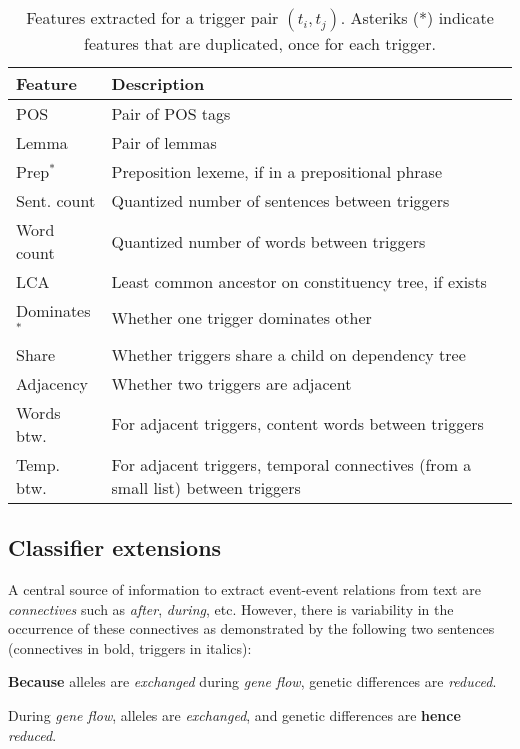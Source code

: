 \begin{table}[t]
\setlength{\tabcolsep}{5pt}
{\scriptsize
\hfill{}
\begin{tabular}{|p{1.3cm}|p{6cm}|}
\hline
\textbf{Feature} &\textbf{Description}\\
\hline
 POS & \scriptsize{Pair of POS tags} \\
Lemma & \scriptsize{Pair of lemmas} \\
Prep$^*$ & \scriptsize{Preposition lexeme, if in a prepositional phrase} \\
Sent. count & \scriptsize{Quantized number of sentences between triggers} \\
Word count & \scriptsize{Quantized number of words between triggers} \\
LCA & \scriptsize{Least common ancestor on constituency tree, if exists} \\
Dominates$^*$ & \scriptsize{Whether one trigger dominates other} \\
Share & \scriptsize{Whether triggers share a child on dependency tree} \\
Adjacency & \scriptsize{Whether two triggers are adjacent} \\
Words btw. & \scriptsize{For adjacent triggers, content words between triggers} \\
Temp. btw. & \scriptsize{For adjacent triggers, temporal connectives (from a small list) between triggers} \\
\hline
\end{tabular}}
\hfill{}
\caption{Features extracted for a trigger pair $(t_i,t_j)$. Asteriks (*) indicate features that are duplicated, once for each trigger.}
\label{tab:features}
\end{table}

\subsection{Classifier extensions} \label{subsec:pairwise-novel}

A central source of information to extract event-event relations from text are \emph{connectives} such as \emph{after}, \emph{during}, etc. However, there is variability in the occurrence of these connectives as demonstrated by the following two sentences (connectives in bold, triggers in italics):

\begin{enumerate}[itemsep=0pt,topsep=0pt] \footnotesize{
\item \textbf{Because} alleles are \emph{exchanged} during \emph{gene flow}, genetic differences are \emph{reduced}. \label{sent:1}
\item During \emph{gene flow}, alleles are \emph{exchanged}, and genetic differences are \textbf{hence} \emph{reduced}. \label{sent:2}}
\end{enumerate}

